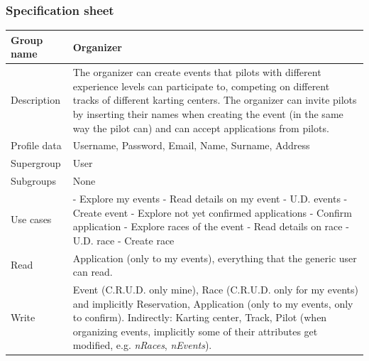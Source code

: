 \documentclass{beamer}
\begin{document}
\begin{frame}
    \frametitle{Specification sheet}
    \begin{table}
        \tiny
        \begin{tabular}{|p{2cm}|p{6cm}|}
        \hline
        Group name & \textbf{Organizer} \\
        \hline
        Description & The organizer can create events that pilots with different experience levels can participate to,
        competing on different tracks of different karting centers. The organizer can invite pilots by inserting their names
        when creating the event (in the same way the pilot can) and can accept applications from pilots. \\
        \hline
        Profile data & Username, Password, Email, Name, Surname, Address \\
        \hline
        Supergroup & User \\
        \hline
        Subgroups & None \\
        \hline
        Use cases &
        - Explore my events \newline
        - Read details on my event \newline
        - U.D. events \newline
        - Create event \newline
        - Explore not yet confirmed applications \newline
        - Confirm application \newline
        - Explore races of the event \newline
        - Read details on race \newline
        - U.D. race \newline
        - Create race \\
        \hline
        Read & Application (only to my events), everything that the generic user can read. \\
        \hline
        Write & Event (C.R.U.D. only mine), Race (C.R.U.D. only for my events) and implicitly Reservation, Application (only to my events, only to confirm). \newline
        Indirectly: Karting center, Track, Pilot (when organizing events, implicitly some of their 
        attributes get modified, e.g. \textit{nRaces}, \textit{nEvents}). \\
        \hline
        \end{tabular}
    \end{table}
\end{frame}
\end{document}
